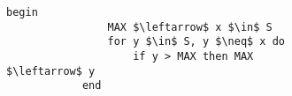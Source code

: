 \documentclass{subfiles}
\begin{document}
\begin{figure}[!h]
    \centering
    \begin{subfigure}[b]{0.45\textwidth}
        \begin{lstlisting}[language = algol]
            begin
                MAX $\leftarrow$ x $\in$ S
                for y $\in$ S, y $\neq$ x do
                    if y > MAX then MAX $\leftarrow$ y
            end
        \end{lstlisting}
    \end{subfigure}
\end{figure}
\end{document}
